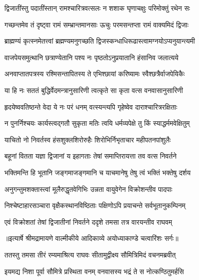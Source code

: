 \twolineshloka
{द्विजातींस्तु पदातींस्तान् रामश्चारित्रवत्सलः}
{न शशाक घृणाचक्षुः परिमोक्तुं रथेन सः} %

\twolineshloka
{गच्छन्तमेव तं दृष्ट्वा रामं सम्भ्रान्तमानसाः}
{ऊचुः परमसन्तप्ता रामं वाक्यमिदं द्विजाः} %

\twolineshloka
{ब्राह्मण्यं कृत्स्नमेतत्त्वां ब्रह्मण्यमनुगच्छति}
{द्विजस्कन्धाधिरूढास्त्वामग्नयोऽप्यनुयान्त्यमी} %

\twolineshloka
{वाजपेयसमुत्थानि छत्राण्येतानि पश्य नः}
{पृष्ठतोऽनुप्रयातानि हंसानिव जलात्यये} %

\twolineshloka
{अनवाप्तातपत्रस्य रश्मिसन्तापितस्य ते}
{एभिश्छायां करिष्यामः स्वैश्छत्रैर्वाजपेयिकैः} %

\twolineshloka
{या हि नः सततं बुद्धिर्वेदमन्त्रानुसारिणी}
{त्वत्कृते सा कृता वत्स वनवासानुसारिणी} %

\twolineshloka
{हृदयेष्ववतिष्ठन्ते वेदा ये नः परं धनम्}
{वत्स्यन्त्यपि गृहेष्वेव दाराश्चारित्ररक्षिताः} %

\twolineshloka
{न पुनर्निश्चयः कार्यस्त्वद्गतौ सुकृता मतिः}
{त्वयि धर्मव्यपेक्षे तु किं स्याद्धर्ममवेक्षितुम्} %

\twolineshloka
{याचितो नो निवर्तस्व हंसशुक्लशिरोरुहैः}
{शिरोभिर्निभृताचार महीपतनपांशुलैः} %

\twolineshloka
{बहूनां वितता यज्ञा द्विजानां य इहागताः}
{तेषां समाप्तिरायत्ता तव वत्स निवर्तने} %

\twolineshloka
{भक्तिमन्ति हि भूतानि जङ्गमाजङ्गमानि च}
{याचमानेषु तेषु त्वं भक्तिं भक्तेषु दर्शय} %

\twolineshloka
{अनुगन्तुमशक्तास्त्वां मूलैरुद्धृतवेगिभिः}
{उन्नता वायुवेगेन विक्रोशन्तीव पादपाः} %

\twolineshloka
{निश्चेष्टाहारसञ्चारा वृक्षैकस्थानविष्ठिताः}
{पक्षिणोऽपि प्रयाचन्ते सर्वभूतानुकम्पिनम्} %

\twolineshloka
{एवं विक्रोशतां तेषां द्विजातीनां निवर्तने}
{ददृशे तमसा तत्र वारयन्तीव राघवम्} %


{॥इत्यार्षे श्रीमद्रामायणे वाल्मीकीये आदिकाव्ये अयोध्याकाण्डे चत्वारिंशः सर्गः॥}


\twolineshloka
{ततस्तु तमसा तीरं रम्यमाश्रित्य राघवः}
{सीतामुद्वीक्ष्य सौमित्रिमिदं वचनमब्रवीत्} %

\twolineshloka
{इयमद्य निशा पूर्वा सौमित्रे प्रस्थिता वनम्}
{वनवासस्य भद्रं ते स नोत्कण्ठितुमर्हसि} %

